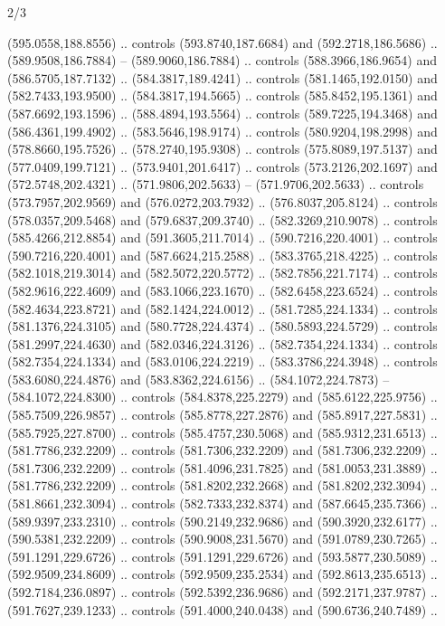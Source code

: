 \begin{flagdescription}{2/3}
\begin{scope}[xshift=0.5\flaglength,yshift=0.5\flagwidth,scale=\flagwidth/525.28]
\begin{scope}[y=0.1mm, x=0.1mm, yscale=-1,shift={(-381.5,-404)}]
  (595.0558,188.8556) .. controls (593.8740,187.6684) and (592.2718,186.5686) ..
  (589.9508,186.7884) -- (589.9060,186.7884) .. controls (588.3966,186.9654) and
  (586.5705,187.7132) .. (584.3817,189.4241) .. controls (581.1465,192.0150) and
  (582.7433,193.9500) .. (584.3817,194.5665) .. controls (585.8452,195.1361) and
  (587.6692,193.1596) .. (588.4894,193.5564) .. controls (589.7225,194.3468) and
  (586.4361,199.4902) .. (583.5646,198.9174) .. controls (580.9204,198.2998) and
  (578.8660,195.7526) .. (578.2740,195.9308) .. controls (575.8089,197.5137) and
  (577.0409,199.7121) .. (573.9401,201.6417) .. controls (573.2126,202.1697) and
  (572.5748,202.4321) .. (571.9806,202.5633) -- (571.9706,202.5633) .. controls
  (573.7957,202.9569) and (576.0272,203.7932) .. (576.8037,205.8124) .. controls
  (578.0357,209.5468) and (579.6837,209.3740) .. (582.3269,210.9078) .. controls
  (585.4266,212.8854) and (591.3605,211.7014) .. (590.7216,220.4001) .. controls
  (590.7216,220.4001) and (587.6624,215.2588) .. (583.3765,218.4225) .. controls
  (582.1018,219.3014) and (582.5072,220.5772) .. (582.7856,221.7174) .. controls
  (582.9616,222.4609) and (583.1066,223.1670) .. (582.6458,223.6524) .. controls
  (582.4634,223.8721) and (582.1424,224.0012) .. (581.7285,224.1334) .. controls
  (581.1376,224.3105) and (580.7728,224.4374) .. (580.5893,224.5729) .. controls
  (581.2997,224.4630) and (582.0346,224.3126) .. (582.7354,224.1334) .. controls
  (582.7354,224.1334) and (583.0106,224.2219) .. (583.3786,224.3948) .. controls
  (583.6080,224.4876) and (583.8362,224.6156) .. (584.1072,224.7873) --
  (584.1072,224.8300) .. controls (584.8378,225.2279) and (585.6122,225.9756) ..
  (585.7509,226.9857) .. controls (585.8778,227.2876) and (585.8917,227.5831) ..
  (585.7925,227.8700) .. controls (585.4757,230.5068) and (585.9312,231.6513) ..
  (581.7786,232.2209) .. controls (581.7306,232.2209) and (581.7306,232.2209) ..
  (581.7306,232.2209) .. controls (581.4096,231.7825) and (581.0053,231.3889) ..
  (581.7786,232.2209) .. controls (581.8202,232.2668) and (581.8202,232.3094) ..
  (581.8661,232.3094) .. controls (582.7333,232.8374) and (587.6645,235.7366) ..
  (589.9397,233.2310) .. controls (590.2149,232.9686) and (590.3920,232.6177) ..
  (590.5381,232.2209) .. controls (590.9008,231.5670) and (591.0789,230.7265) ..
  (591.1291,229.6726) .. controls (591.1291,229.6726) and (593.5877,230.5089) ..
  (592.9509,234.8609) .. controls (592.9509,235.2534) and (592.8613,235.6513) ..
  (592.7184,236.0897) .. controls (592.5392,236.9686) and (592.2171,237.9787) ..
  (591.7627,239.1233) .. controls (591.4000,240.0438) and (590.6736,240.7489) ..

\end{scope}
\end{scope}
\end{flagdescription}
